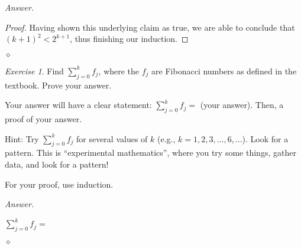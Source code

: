 \documentclass[12pt,oneside]{amsart}
\theoremstyle{remark}
\newtheorem{exer}{Exercise}
\newenvironment{answer}{\bigskip\noindent\emph{Answer.}}{\hfill$\diamond$\newline}
\begin{document}
\begin{answer}
\begin{proof}
Having shown this underlying claim as true, we are able to conclude that $(k + 1)^2 < 2^{k + 1}$, thus finishing our induction. %
\end{proof}

\end{answer}

%
%
%
%

\newpage
\begin{exer}
Find $\sum_{j = 0}^k f_j$, where the $f_j$ are Fibonacci numbers as defined in the textbook. Prove your answer.

Your answer will have a clear statement: $\sum_{j = 0}^k f_j =$ (your answer). Then, a proof of your answer.

Hint: Try $\sum_{j = 0}^k f_j$ for several values of $k$ (e.g., $k = 1, 2, 3, ..., 6, ...$). Look for a pattern. This is “experimental mathematics”, where you try some things, gather data, and look for a pattern!

For your proof, use induction.
\end{exer}

\begin{answer}

$\sum_{j = 0}^k f_j = $

\end{answer}
\end{document}
